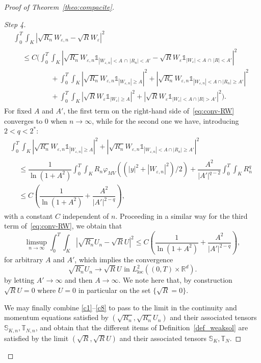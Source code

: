\documentclass[AHL,Unicode,longabstracts]{cedram}
\newcommand*{\un}{\mathds{1}}
\newcommand*{\loc}{\mathrm{loc}}
\newcommand*\<{\left\langle}
\renewcommand*\>{\right\rangle}
\renewcommand*\le{\leqslant}
\renewcommand*\ge{\geqslant}
\newcommand*\eps{\varepsilon}
\begin{document}
\begin{proof}[Proof of Theorem~\ref{theo:compacite}]
\begin{proof}[Step 4]
\begin{multline}
\int_{0}^T \int_K \left|\sqrt{R_n} W_{\eps,n} - \sqrt{R} W_{\eps} \right|^2 \\
\begin{aligned}
& \le C \Bigg (
\int_{0}^T \int_K \left|\sqrt{R_n} W_{\eps,n} \un_{|W_{\eps,n}| < A \, \cap \, |R_n| < A'} - \sqrt{R} W_{\eps} \un_{|W_{\eps}| < A \, \cap \, |R| < A'} \right|^2 \\
&\qquad \qquad + \int_{0}^T \int_K \left|\sqrt{R_n} W_{\eps,n} \un_{|W_{\eps,n}| \ge A}\right|^2 + \left|\sqrt{R_n} W_{\eps,n} \un_{|W_{\eps,n}| < A \cap |R_n |\ge A' }\right|^2 \\
&\qquad\qquad + \int_{0}^T \int_K \left|\sqrt{R} W_{\eps} \un_{|W_{\eps}| \ge A}\right|^2 + \left|\sqrt{R} W_{\eps} \un_{|W_{\eps}| < A \cap |R| > A' }\right|^2
\Bigg).
\end{aligned}
\end{multline}
For fixed $A$ and $A'$, the first term on the right-hand side of~\eqref{eq:conv-RW} converges to $0$ when $n\to \infty$, while for the second one we have, introducing $2 < q < 2^{*}$:
\begin{multline*}
\int_{0}^T \int_K \left|\sqrt{R_n} W_{\varepsilon,n} \un_{|W_{\varepsilon,n}| \ge A}\right|^2 + \left|\sqrt{R_n} W_{\varepsilon,n} \un_{|W_{\varepsilon,n}| < A \cap |R_n| \ge A' }\right|^2\\
\begin{aligned}
&\le \dfrac{1}{\ln(1+A^2)} \int_{0}^T \int_K R_n \varphi_{MV}((|y|^2 + |W_{\varepsilon,n}|^2)/2) + \dfrac{A^2}{|A'|^{q-2}}\int_{0}^T \int_K R_n^{q} \\
&\le C \left(\dfrac{1}{\ln(1+A^2)} + \dfrac{A^2}{|A'|^{2-q}} \right),
\end{aligned}
\end{multline*}
with a constant $C$ independent of $n.$ Proceeding in a similar way for the third term of~\eqref{eq:conv-RW}, we obtain that
\[
\limsup_{n \to \infty} \int_{0}^T \int_K \left|\sqrt{R_n} U_n - \sqrt{R} U \right|^2
\le C \left(\dfrac{1}{\ln(1+A^2)} + \dfrac{A^2}{|A'|^{2-q}} \right),
\]
for arbitrary $A$ and $A'$, which implies the convergence
\begin{equation}\label{c8}
\tag{c8}
\sqrt{R_n} U_n \to \sqrt{R}U \text{ in $L^2_{\loc}((0,T) \times \mathbb R^d)$}.
\end{equation}
by letting $A' \to \infty$ and then $A \to \infty.$ We note here that, by construction $\sqrt{R} U = 0$ where $U =0$ in particular on the set $\{\sqrt{R}=0\}.$

We may finally combine \eqref{c1}--\eqref{c8} to pass to the limit in the continuity and momentum equations satisfied by $(\sqrt{R_n},\sqrt{R_n}U_n)$ and their associated tensors $\mathbb S_{K,n}, \mathbb T_{N,n}$, and obtain that the different items of Definition~\ref{def_weaksol} are satisfied by the limit $(\sqrt{R},\sqrt{R}U)$ and their associated tensors $\mathbb S_{K}, \mathbb T_{N}$.
\end{proof}
\let\qed\relax
\end{proof}
\end{document}
